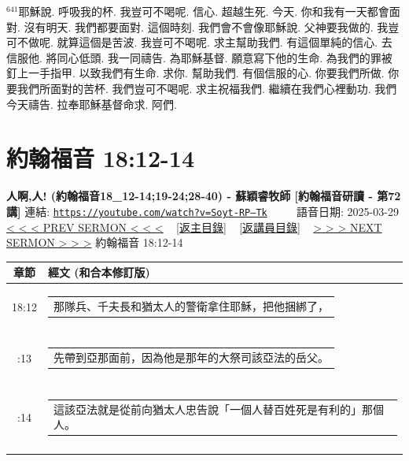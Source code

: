 \documentclass{book}
\begin{document}
$^{641}$耶穌說.
呼吸我的杯.
我豈可不喝呢.
信心.
超越生死.
今天.
你和我有一天都會面對.
沒有明天.
我們都要面對.
這個時刻.
我們會不會像耶穌說.
父神要我做的.
我豈可不做呢.
就算這個是苦波.
我豈可不喝呢.
求主幫助我們.
有這個單純的信心.
去信服他.
將同心低頭.
我一同禱告.
為耶穌基督.
願意寫下他的生命.
為我們的罪被釘上一手指甲.
以致我們有生命.
求你.
幫助我們.
有個信服的心.
你要我們所做.
你要我們所面對的苦杯.
我們豈可不喝呢.
求主祝福我們.
繼續在我們心裡動功.
我們今天禱告.
拉奉耶穌基督命求.
阿們.
\newpage



\section{約翰福音 18:12-14}
\label{sec:Soyt_RP__Tk}
\textbf{人啊,人! (約翰福音18\_12-14;19-24;28-40) - 蘇穎睿牧師 [約翰福音研讀 - 第72講]}
\newline
\newline
連結: \href{https://youtube.com/watch?v=Soyt-RP--Tk}{\texttt{https://youtube.com/watch?v=Soyt-RP--Tk}} ~~~~ 語音日期: 2025-03-29
\newline
\newline
\hyperref[sec:OFW3ofO9w3Y]{< < < PREV SERMON < < <}
~
\hyperlink{toc}{[返主目錄]}
~
\hyperref[ch:preacher10]{[返講員目錄]}
~
\hyperref[sec:8Xvna8FV9_s]{> > > NEXT SERMON > > >}
\newline
\newline
約翰福音 18:12-14
\newline
\begin{longtable}{cl}
\hline
\hline
章節 & 經文 (和合本修訂版)\\
\hline
18:12 & \begin{tabularx}{0.7\textwidth}{X} 那隊兵、千夫長和猶太人的警衛拿住耶穌，把他捆綁了， \end{tabularx} \\ \\ \relax
18:13 & \begin{tabularx}{0.7\textwidth}{X} 先帶到亞那面前，因為他是那年的大祭司該亞法的岳父。 \end{tabularx} \\ \\ \relax
18:14 & \begin{tabularx}{0.7\textwidth}{X} 這該亞法就是從前向猶太人忠告說「一個人替百姓死是有利的」那個人。 \end{tabularx} \\ \\
[1ex]
\hline
\hline
\end{longtable}
\end{document}
